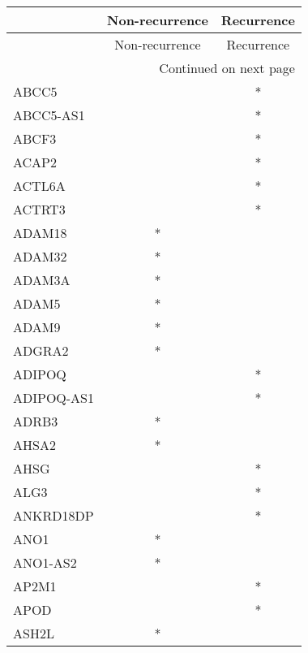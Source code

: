 \begin{longtable}{lcc}
\toprule
{} & Non-recurrence & Recurrence \\
\midrule
\endfirsthead

\toprule
{} & Non-recurrence & Recurrence \\
\midrule
\endhead
\midrule
\multicolumn{3}{r}{{Continued on next page}} \\
\midrule
\endfoot

\bottomrule
\endlastfoot
ABCC5            &                &          * \\
ABCC5-AS1        &                &          * \\
ABCF3            &                &          * \\
ACAP2            &                &          * \\
ACTL6A           &                &          * \\
ACTRT3           &                &          * \\
ADAM18           &              * &            \\
ADAM32           &              * &            \\
ADAM3A           &              * &            \\
ADAM5            &              * &            \\
ADAM9            &              * &            \\
ADGRA2           &              * &            \\
ADIPOQ           &                &          * \\
ADIPOQ-AS1       &                &          * \\
ADRB3            &              * &            \\
AHSA2            &              * &            \\
AHSG             &                &          * \\
ALG3             &                &          * \\
ANKRD18DP        &                &          * \\
ANO1             &              * &            \\
ANO1-AS2         &              * &            \\
AP2M1            &                &          * \\
APOD             &                &          * \\
ASH2L            &              * &            \\

\end{longtable}
